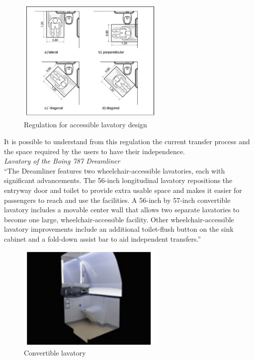 \begin{figure}[h]
\centering
\includegraphics[width=7cm]{brazil_images/image014.png}
\caption{Regulation for accessible lavatory design}
\label{fig:regulation_accessible_lavatory}
\end{figure}


It is possible to understand from this regulation the current transfer process and the space required by the users to have their independence.\\

\noindent\emph{Lavatory of the Boing 787 Dreamliner}\\ “The Dreamliner features two wheelchair-accessible lavatories, each with significant advancements. The 56-inch longitudinal lavatory repositions the entryway door and toilet to provide extra usable space and makes it easier for passengers to reach and use the facilities. A 56-inch by 57-inch convertible lavatory includes a movable center wall that allows two separate lavatories to become one large, wheelchair-accessible facility. Other wheelchair-accessible lavatory improvements include an additional toilet-flush button on the sink cabinet and a fold-down assist bar to aid independent transfers.” \cite{2014pn}\\ 

\begin{figure}[h]
\centering
\includegraphics[width=7cm]{brazil_images/image015.png}
\caption{Convertible lavatory}
\label{fig:convertible_lavatory}
\end{figure}


